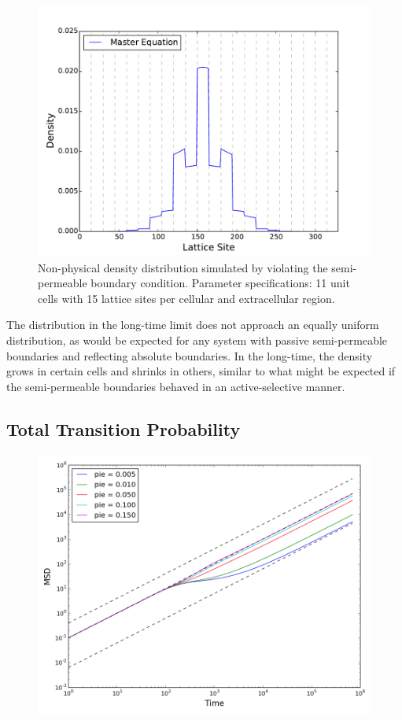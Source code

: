 	\begin{figure}[h]
		\centering
		\includegraphics[width=1.0\linewidth]{../images/1D/11U_heterogeneous_plots_1D_nonphysical}
		\caption{Non-physical density distribution simulated by violating the semi-permeable boundary condition. Parameter specifications: 11 unit cells with 15 lattice sites per cellular and extracellular region. }
		\label{fig:11U_heterogeneous_plots_1D_nonphysical}
	\end{figure}
	
	The distribution in the long-time limit does not approach an equally uniform distribution, as would be expected for any system with passive semi-permeable boundaries and reflecting absolute boundaries. In the long-time, the density grows in certain cells and shrinks in others, similar to what might be expected if the semi-permeable boundaries behaved in an active-selective manner.

\subsection{Total Transition Probability}

	\begin{figure}[h]
		\centering
		\includegraphics[width=1.0\linewidth]{../images/1D/pie_msd_1D}
		\caption{}
		\label{fig:pie_msd_1D}
	\end{figure}
	
